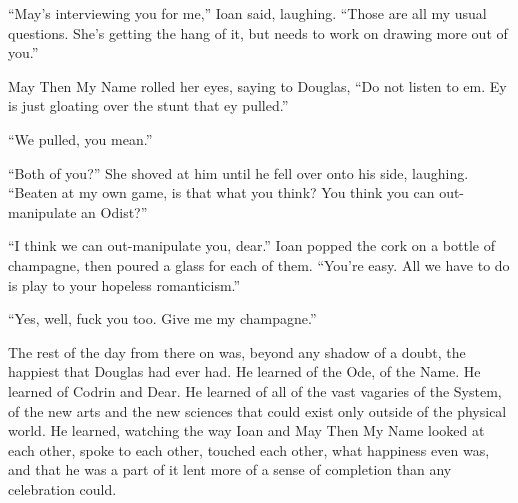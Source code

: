 ``May's interviewing you for me,'' Ioan said, laughing. ``Those are all my usual questions. She's getting the hang of it, but needs to work on drawing more out of you.''

May Then My Name rolled her eyes, saying to Douglas, ``Do not listen to em. Ey is just gloating over the stunt that ey pulled.''

``We pulled, you mean.''

``Both of you?'' She shoved at him until he fell over onto his side, laughing. ``Beaten at my own game, is that what you think? You think you can out-manipulate an Odist?''

``I think we can out-manipulate you, dear.'' Ioan popped the cork on a bottle of champagne, then poured a glass for each of them. ``You're easy. All we have to do is play to your hopeless romanticism.''

``Yes, well, fuck you too. Give me my champagne.''

The rest of the day from there on was, beyond any shadow of a doubt, the happiest that Douglas had ever had. He learned of the Ode, of the Name. He learned of Codrin and Dear. He learned of all of the vast vagaries of the System, of the new arts and the new sciences that could exist only outside of the physical world. He learned, watching the way Ioan and May Then My Name looked at each other, spoke to each other, touched each other, what happiness even was, and that he was a part of it lent more of a sense of completion than any celebration could.
